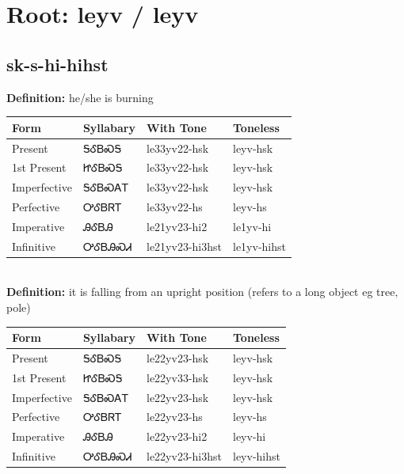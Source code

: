 \documentclass{article}%
\begin{document}
%
\normalsize%
\section*{Root: leyv / leyv}%
\subsection*{sk-s-hi-hihst}%
\textbf{Definition: }%
he/she is burning%
\\[0.5em]%
\begin{tabular}{|l|l|l|l|}%
\hline%
\textbf{Form}&\textbf{Syllabary}&\textbf{With Tone}&\textbf{Toneless}\\%
\hline%
Present&ᎦᎴᏴᏍᎦ&le33yv22{-}hsk&leyv{-}hsk\\%
1st Present&ᏥᎴᏴᏍᎦ&le33yv22{-}hsk&leyv{-}hsk\\%
Imperfective&ᎦᎴᏴᏍᎪᎢ&le33yv22{-}hsk&leyv{-}hsk\\%
Perfective&ᎤᎴᏴᏒᎢ&le33yv22{-}hs&leyv{-}hs\\%
Imperative&ᎯᎴᏴᎯ&le21yv23{-}hi2&le1yv{-}hi\\%
Infinitive&ᎤᎴᏴᎯᏍᏗ&le21yv23{-}hi3hst&le1yv{-}hihst\\%
\hline%
\end{tabular}%
\\[1em]%
\textbf{Definition: }%
it is falling from an upright position (refers to a long object eg tree‚ pole)%
\\[0.5em]%
\begin{tabular}{|l|l|l|l|}%
\hline%
\textbf{Form}&\textbf{Syllabary}&\textbf{With Tone}&\textbf{Toneless}\\%
\hline%
Present&ᎦᎴᏴᏍᎦ&le22yv23{-}hsk&leyv{-}hsk\\%
1st Present&ᏥᎴᏴᏍᎦ&le22yv33{-}hsk&leyv{-}hsk\\%
Imperfective&ᎦᎴᏴᏍᎪᎢ&le22yv23{-}hsk&leyv{-}hsk\\%
Perfective&ᎤᎴᏴᏒᎢ&le22yv23{-}hs&leyv{-}hs\\%
Imperative&ᎯᎴᏴᎯ&le22yv23{-}hi2&leyv{-}hi\\%
Infinitive&ᎤᎴᏴᎯᏍᏗ&le22yv23{-}hi3hst&leyv{-}hihst\\%
\hline%
\end{tabular}%
\\[1em]%
\end{document}
